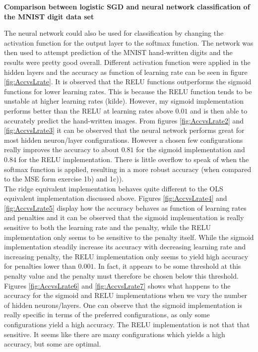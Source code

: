 \documentclass[12pt,a4paper]{article}
\begin{document}
\begin{center}
\large{\textbf{Comparison between logistic SGD and neural network classification of the MNIST digit data set}}
\end{center}

\noindent The neural network could also be used for classification by changing the activation function for the output layer to the softmax function. The network was then used to attempt prediction of the MNIST hand-written digits and the results were pretty good overall. Different activation function were applied in the hidden layers and the accuracy as function of learning rate can be seen in figure \ref{fig:AccvsLrate}. It is observed that the RELU functions outperforms the sigmoid functions for lower learning rates. This is because the RELU function tends to be unstable at higher learning rates (kilde). However, my sigmoid implementation performs better than the RELU at learning rates above $0.01$ and is then able to accurately predict the hand-written images. From figures \ref{fig:AccvsLrate2} and \ref{fig:AccvsLrate3} it can be observed that the neural network performs great for most hidden neuron/layer configurations. However a chosen few configurations really improves the accuracy to about $0.81$ for the sigmoid implementation and $0.84$ for the RELU implementation. There is little overflow to speak of when the softmax function is applied, resulting in a more robust accuracy (when compared to the MSE form exercise 1b) and 1c)). 
\\
The ridge equivalent implementation behaves quite different to the OLS equivalent implementation discussed above. Figures \ref{fig:AccvsLrate4} and \ref{fig:AccvsLrate5} display how the accuracy behaves as function of learning rates and penalties and it can be observed that the sigmoid implementation is really sensitive to both the learning rate and the penalty, while the RELU implementation only seems to be sensitive to the penalty itself. While the sigmoid implementation steadily increase its accuracy with decreasing learning rate and increasing penalty, the RELU implementation only seems to yield high accuracy for penalties lower than $0.001$. In fact, it appears to be some threshold at this penalty value and the penalty must therefore be chosen below this threshold. Figures \ref{fig:AccvsLrate6} and \ref{fig:AccvsLrate7} shows what happens to the accuracy for the sigmoid and RELU implementations when we vary the number of hidden neurons/layers. One can observe that the sigmoid implementation is really specific in terms of the preferred configurations, as only some configurations yield a high accuracy. The RELU implementation is not that that sensitive. It seems like there are many configurations which yields a high accuracy, but some are optimal. 
\end{document}
